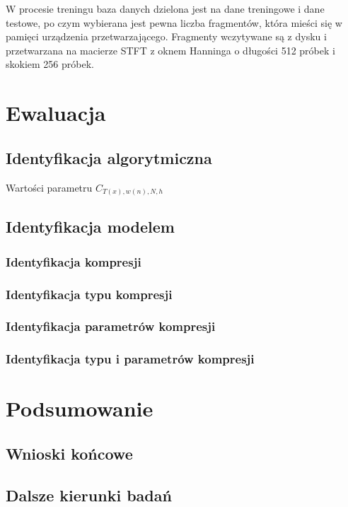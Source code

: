 \documentclass[pl,12pt]{aghdpl}
\let\Oldchapter\chapter%
\renewcommand{\chapter}{\FloatBarrier\Oldchapter}
\let\Oldsection\section%
\renewcommand{\section}{\FloatBarrier\Oldsection}
\let\Oldsubsection\subsection%
\renewcommand{\subsection}{\FloatBarrier\Oldsubsection}
\begin{document}
W procesie treningu baza danych dzielona jest na dane treningowe i dane
testowe, po czym wybierana jest pewna liczba fragmentów, która mieści się w
pamięci urządzenia przetwarzającego. Fragmenty wczytywane są z dysku i
przetwarzana na macierze STFT z oknem Hanninga o długości 512 próbek i skokiem
256 próbek.
\chapter{Ewaluacja}
\section{Identyfikacja algorytmiczna}
\begin{table}[!tbh]
  \centering
  \caption{Wartości parametru $C_{T(x),w(n),N,h}$}
  
\end{table}
\section{Identyfikacja modelem}
\subsection{Identyfikacja kompresji}
\subsection{Identyfikacja typu kompresji}
\subsection{Identyfikacja parametrów kompresji}
\subsection{Identyfikacja typu i parametrów kompresji}
\chapter{Podsumowanie}
\section{Wnioski końcowe}
\section{Dalsze kierunki badań}

\cleardoublepage{}
\printbibliography{}
\end{document}
